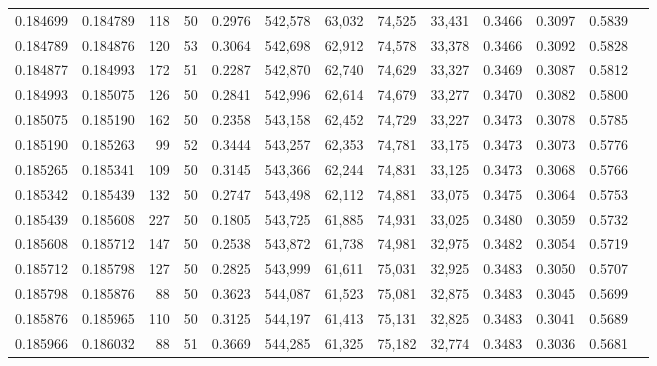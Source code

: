 \begin{tabular}{rrrrrrrrrrrrr}
0.184699 & 0.184789 &   118 &  50 &                                     0.2976 & 542,578 &  63,032 &  74,525 &  33,431 & 0.3466 & 0.3097 & 0.5839 \\
0.184789 & 0.184876 &   120 &  53 &                                     0.3064 & 542,698 &  62,912 &  74,578 &  33,378 & 0.3466 & 0.3092 & 0.5828 \\
0.184877 & 0.184993 &   172 &  51 &                                     0.2287 & 542,870 &  62,740 &  74,629 &  33,327 & 0.3469 & 0.3087 & 0.5812 \\
0.184993 & 0.185075 &   126 &  50 &                                     0.2841 & 542,996 &  62,614 &  74,679 &  33,277 & 0.3470 & 0.3082 & 0.5800 \\
0.185075 & 0.185190 &   162 &  50 &                                     0.2358 & 543,158 &  62,452 &  74,729 &  33,227 & 0.3473 & 0.3078 & 0.5785 \\
0.185190 & 0.185263 &    99 &  52 &                                     0.3444 & 543,257 &  62,353 &  74,781 &  33,175 & 0.3473 & 0.3073 & 0.5776 \\
0.185265 & 0.185341 &   109 &  50 &                                     0.3145 & 543,366 &  62,244 &  74,831 &  33,125 & 0.3473 & 0.3068 & 0.5766 \\
0.185342 & 0.185439 &   132 &  50 &                                     0.2747 & 543,498 &  62,112 &  74,881 &  33,075 & 0.3475 & 0.3064 & 0.5753 \\
0.185439 & 0.185608 &   227 &  50 &                                     0.1805 & 543,725 &  61,885 &  74,931 &  33,025 & 0.3480 & 0.3059 & 0.5732 \\
0.185608 & 0.185712 &   147 &  50 &                                     0.2538 & 543,872 &  61,738 &  74,981 &  32,975 & 0.3482 & 0.3054 & 0.5719 \\
0.185712 & 0.185798 &   127 &  50 &                                     0.2825 & 543,999 &  61,611 &  75,031 &  32,925 & 0.3483 & 0.3050 & 0.5707 \\
0.185798 & 0.185876 &    88 &  50 &                                     0.3623 & 544,087 &  61,523 &  75,081 &  32,875 & 0.3483 & 0.3045 & 0.5699 \\
0.185876 & 0.185965 &   110 &  50 &                                     0.3125 & 544,197 &  61,413 &  75,131 &  32,825 & 0.3483 & 0.3041 & 0.5689 \\
0.185966 & 0.186032 &    88 &  51 &                                     0.3669 & 544,285 &  61,325 &  75,182 &  32,774 & 0.3483 & 0.3036 & 0.5681 \\

\end{tabular}
